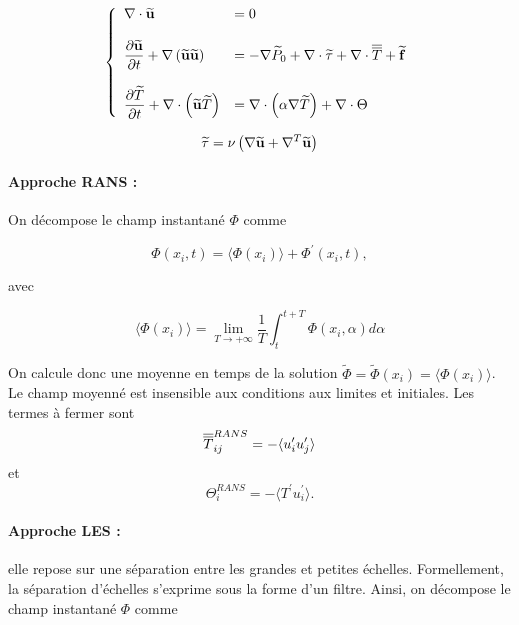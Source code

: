 \begin{equation}
\left\lbrace
\begin{array}{ll}
\nabla\cdot{\widetilde{\mathbf{u}}}&=0\\
\\
{\ds{\frac{\partial {\widetilde{\mathbf{u}}}}{\partial t}+\nabla \left( {\widetilde{\mathbf{u}}}{\widetilde{\mathbf{u}}}\right)}} &=-\nabla {\widetilde{P}}_0 +\nabla \cdot {\widetilde{\tau}} +\nabla \cdot \dbar T+ {\widetilde{{\mbf f}}} \\
\\
{\ds{\frac{\partial{\widetilde{ T}}}{\partial t}+\nabla\cdot \left( {\widetilde{\mbf{u}}}{\widetilde{T}}\right)}}& = \nabla \cdot \left( \alpha\nabla {\widetilde{T}}\right) + \nabla\cdot \Theta
\end{array}\right.
\end{equation}

$$ {\widetilde{\tau}} =   \nu  \left( \nabla {\widetilde{\mbf u }} +\nabla ^T {\widetilde{\mbf u}} \right) $$ 

\paragraph{Approche RANS :}
On d\'ecompose le champ instantan\'e $\Phi$ comme 

\begin{equation}
\Phi (x_i,t)=\langle \Phi (x_i) \rangle + {\Phi}^{\prime}  (x_i,t),
\end{equation}

avec 

\begin{equation}
\langle \Phi (x_i) \rangle=\lim _{T\rightarrow +\infty}\frac{1}{T}\int _{t}^{t+T} \Phi (x_i,\alpha)d\alpha
\end{equation}

On calcule donc une moyenne en temps de la solution $ \widetilde \Phi=\widetilde \Phi (x_i) =\langle \Phi (x_i) \rangle$. Le champ  moyenn\'e est insensible aux conditions aux limites et initiales. Les termes \`a fermer sont $$\dbar T ^{RANS}_{ij}=-\langle u_i^{\prime} u_j^{\prime} \rangle $$ et $$ \Theta ^{RANS}_i=-\langle T^{\prime} u_i^{\prime} \rangle. $$


\paragraph{Approche LES :} elle repose sur une s\'eparation entre les grandes et petites \'echelles. Formellement, la s\'eparation d'\'echelles s'exprime sous la forme d'un filtre. Ainsi, on d\'ecompose le champ instantan\'e $\Phi$ comme

